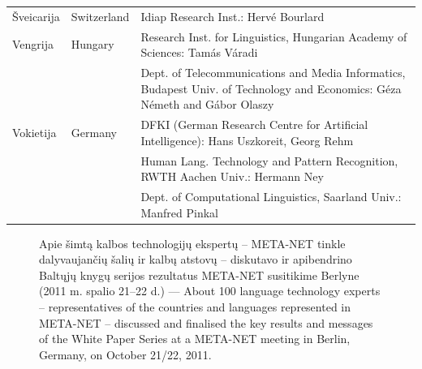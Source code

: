 \documentclass[]{../metanetpaper}
\begin{document}
\begin{longtable}{llp{105mm}}
  Šveicarija & \textcolor{grey1}{Switzerland} & Idiap Research Inst.: Hervé Bourlard \\ \addlinespace 
  Vengrija & \textcolor{grey1}{Hungary} & Research Inst. for Linguistics, Hungarian Academy of Sciences: Tamás Váradi\\  \addlinespace
  & & Dept. of Telecommunications and Media Informatics, Budapest Univ. of Technology and Economics: Géza Németh and Gábor Olaszy\\ \addlinespace
  Vokietija & \textcolor{grey1}{Germany} & DFKI (German Research Centre for Artificial Intelligence): Hans Uszkoreit, Georg Rehm\\ \addlinespace
  & & Human Lang. Technology and Pattern Recognition, RWTH Aachen Univ.: Hermann Ney \\ \addlinespace
  & & Dept. of Computational Linguistics, Saarland Univ.: Manfred Pinkal
\end{longtable}
\normalsize

\renewcommand*{\figureformat}{}
\renewcommand*{\captionformat}{}

\begin{figure}[htbp]
  \center
  \caption{Apie šimtą kalbos technologijų ekspertų -- META-NET tinkle dalyvaujančių šalių ir kalbų atstovų -- diskutavo ir apibendrino Baltųjų knygų serijos rezultatus META-NET susitikime Berlyne (2011 m. spalio 21–22 d.) --- \textcolor{grey1}{About 100 language technology experts -- representatives of the countries and languages represented in META-NET -- discussed and finalised the key results and messages of the White Paper Series at a META-NET meeting in Berlin, Germany, on October 21/22, 2011.}}
\end{figure}

\cleardoublepage

\label{whitepaperseries}
\end{document}
